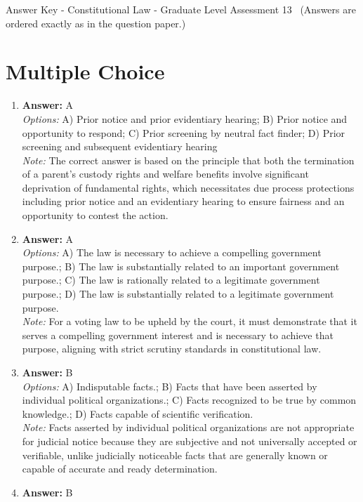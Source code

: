 \documentclass[12pt]{article}
\begin{document}
\begin{center}
Answer Key - Constitutional Law - Graduate Level Assessment 13 \
\small (Answers are ordered exactly as in the question paper.)
\end{center}

\section*{Multiple Choice}
\begin{enumerate}[label=\arabic*.]
\item \textbf{Answer:} A
\\ \textit{Options:} A) Prior notice and prior evidentiary hearing; B) Prior notice and opportunity to respond; C) Prior screening by neutral fact finder; D) Prior screening and subsequent evidentiary hearing
\\ \textit{Note:} The correct answer is based on the principle that both the termination of a parent's custody rights and welfare benefits involve significant deprivation of fundamental rights, which necessitates due process protections including prior notice and an evidentiary hearing to ensure fairness and an opportunity to contest the action.
\item \textbf{Answer:} A
\\ \textit{Options:} A) The law is necessary to achieve a compelling government purpose.; B) The law is substantially related to an important government purpose.; C) The law is rationally related to a legitimate government purpose.; D) The law is substantially related to a legitimate government purpose.
\\ \textit{Note:} For a voting law to be upheld by the court, it must demonstrate that it serves a compelling government interest and is necessary to achieve that purpose, aligning with strict scrutiny standards in constitutional law.
\item \textbf{Answer:} B
\\ \textit{Options:} A) Indisputable facts.; B) Facts that have been asserted by individual political organizations.; C) Facts recognized to be true by common knowledge.; D) Facts capable of scientific verification.
\\ \textit{Note:} Facts asserted by individual political organizations are not appropriate for judicial notice because they are subjective and not universally accepted or verifiable, unlike judicially noticeable facts that are generally known or capable of accurate and ready determination.
\item \textbf{Answer:} B

\end{enumerate}
\end{document}
